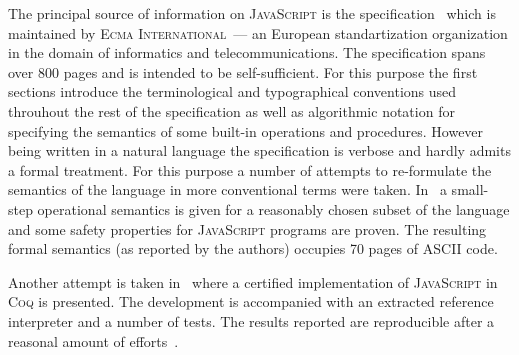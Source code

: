 \documentclass{article}
\newcommand{\js}{\textsc{JavaScript}\xspace}
\newcommand{\es}{\textsc{ECMAScript}\xspace}
\newcommand{\ecma}{\textsc{Ecma International}\xspace}
\begin{document}
The principal source of information on \js is the specification~\cite{Spec} which is maintained by
\ecma~--- an European standartization organization in the domain of informatics and telecommunications.
The specification spans over 800 pages and is intended to be self-sufficient. For this purpose
the first sections introduce the terminological and typographical conventions used throuhout the rest of
the specification as well as algorithmic notation for specifying the semantics of some built-in operations
and procedures. However being written in a natural language the specification is verbose and hardly admits
a formal treatment. For this purpose a number of attempts to re-formulate the semantics of the language
in more conventional terms were taken. In~\cite{Operational1,Operational2} a small-step operational
semantics is given for a reasonably chosen subset of the language and some safety properties for
\js programs are proven. The resulting formal semantics (as reported by the authors) occupies 70 pages of
ASCII code.


\begin{comment}
The papers also investigate the differences in implementations; for example, the following
program

\begin{lstlisting}
   var f =
     function () {
       if (true) {function g () {return 1}}
       else      {function g () {return 2}};
       
       function g () {return 3};
    
       return g ();
    
       function g () {return 4}
     };
\end{lstlisting}

is reported to behave differently (as per moment of writing) under different implementations due to their
different one- vs. multi-pass architectures. The function definitions in \es are \emph{hoisted} (order-preserving
moved to the top of the scope they are declared in), thus the last definition of ``\lstinline|g|'' shadows
all others, which is not always respected by the implementations.
\end{comment}

Another attempt is taken in~\cite{Trusted,JSCert} where a certified implementation of \js in \textsc{Coq} is
presented. The development is accompanied with an extracted reference interpreter and a number of tests. The
results reported are reproducible after a reasonal amount of efforts~\cite{JSCert-lozov}.
\end{document}
